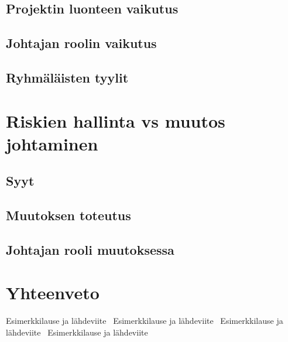 \documentclass[finnish]{tktltiki2}
\theoremstyle{definition}
\theoremstyle{remark}
\begin{document}
\subsection{Projektin luonteen vaikutus}


\subsection{Johtajan roolin vaikutus}

\subsection{Ryhmäläisten tyylit}

\section{Riskien hallinta vs muutos johtaminen}

\subsection{Syyt}

\subsection{Muutoksen toteutus}

\subsection{Johtajan rooli muutoksessa}



\section{Yhteenveto}







 





Esimerkkilause ja lähdeviite~\cite{Zhang:2011:ECL:2047594.2047666}
Esimerkkilause ja lähdeviite~\cite{Dhomne:2012:ITL:2382887.2382899}
Esimerkkilause ja lähdeviite~\cite{Augustine:2005:APM:1101779.1101781}
Esimerkkilause ja lähdeviite~\cite{Chow2008961}~\cite{Li:2006:MOS:1125170.1125182}





%

%
% 
%



\end{document}
